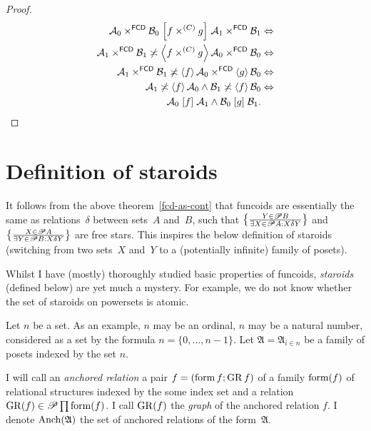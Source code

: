 \begin{proof}
~
\begin{align*}
\mathcal{A}_{0}\times^{\mathsf{FCD}}\mathcal{B}_{0}\mathrel{\left[f\times^{(C)}g\right]}\mathcal{A}_{1}\times^{\mathsf{FCD}}\mathcal{B}_{1} & \Leftrightarrow\\
\mathcal{A}_{1}\times^{\mathsf{FCD}}\mathcal{B}_{1}\not\asymp\left\langle f\times^{(C)}g\right\rangle\mathcal{A}_{0}\times^{\mathsf{FCD}}\mathcal{B}_{0} & \Leftrightarrow\\
\mathcal{A}_{1}\times^{\mathsf{FCD}}\mathcal{B}_{1}\not\asymp\left\langle f\right\rangle\mathcal{A}_{0}\times^{\mathsf{FCD}}\left\langle g\right\rangle\mathcal{B}_{0} & \Leftrightarrow\\
\mathcal{A}_{1}\not\asymp\left\langle f\right\rangle\mathcal{A}_{0}\land\mathcal{B}_{1}\not\asymp\left\langle f\right\rangle\mathcal{B}_{0} & \Leftrightarrow\\
\mathcal{A}_{0}\mathrel{\left[f\right]}\mathcal{A}_{1}\wedge\mathcal{B}_{0}\mathrel{\left[g\right]}\mathcal{B}_{1}.
\end{align*}

\end{proof}

\section{Definition of staroids}

It follows from the above theorem~\ref{fcd-as-cont} that funcoids
are essentially the same as relations~$\delta$ between sets~$A$
and~$B$, such that $\left\{ \frac{Y\in\mathscr{P} B}{\exists X\in\mathscr{P} A:X\mathrel{\delta}Y}\right\}$
and $\left\{ \frac{X\in\mathscr{P} A}{\exists Y\in\mathscr{P} B:X\mathrel{\delta}Y}\right\}$
are free stars. This inspires the below definition of staroids (switching
from two sets~$X$ and~$Y$ to a (potentially infinite) family of
posets).

Whilst I have (mostly) thoroughly studied basic properties of funcoids,
\emph{staroids} (defined below) are yet much a mystery. For example,
we do not know whether the set of staroids on powersets is atomic.

Let $n$ be a set. As an example, $n$ may be an ordinal, $n$ may
be a natural number, considered as a set by the formula $n=\{0,\ldots,n-1\}$.
Let $\mathfrak{A}=\mathfrak{A}_{i\in n}$ be a family of posets indexed
by the set $n$.
\begin{defn}
I will
call an \emph{anchored relation} a pair $f=(\operatorname{form} f;\operatorname{GR} f)$ of a
family $\operatorname{form}(f)$ of relational structures indexed by the some index
set and a relation $\operatorname{GR}(f)\in\mathscr{P}\prod\operatorname{form}(f)$. I call $\operatorname{GR}(f)$
the \emph{graph} of the anchored relation $f$. I denote $\operatorname{Anch}(\mathfrak{A})$
the set of anchored relations of the form~$\mathfrak{A}$.
\end{defn}


